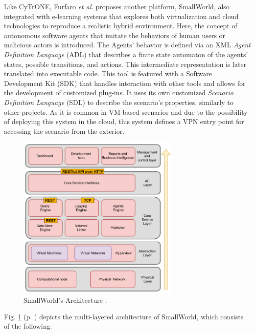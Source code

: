
Like CyTrONE, Furfaro \textit{et al.} \cite{cloud_based_platform_ref} proposes another platform, SmallWorld, also integrated with e-learning systems that explores both virtualization and cloud technologies to reproduce a realistic hybrid environment. Here, the concept of autonomous software agents that imitate the behaviors of human users or malicious actors is introduced. The Agents' behavior is defined via an XML \textit{Agent Definition Language} (ADL) that describes a finite state automaton of the agents' states, possible transitions, and actions. This intermediate representation is later translated into executable code. This tool is featured with a Software Development Kit (SDK) that handles interaction with other tools and allows for the development of customized plug-ins. It uses its own customized \textit{Scenario Definition Language} (SDL) to describe the scenario's properties, similarly to other projects. As it is common in VM-based scenarios and due to the possibility of deploying this system in the cloud, this system defines a VPN entry point for accessing the scenario from the exterior.

\begin{figure}[H]
    \includegraphics[width=8cm]{figures/smallworld_architecture.png}
    \caption{SmallWorld's Architecture \cite{cloud_based_platform_ref}.}
    \label{fig:smallworld_architecture}
\end{figure}

Fig. \ref{fig:smallworld_architecture} (p. \pageref{fig:smallworld_architecture}) depicts the multi-layered architecture of SmallWorld, which consists of the following:

